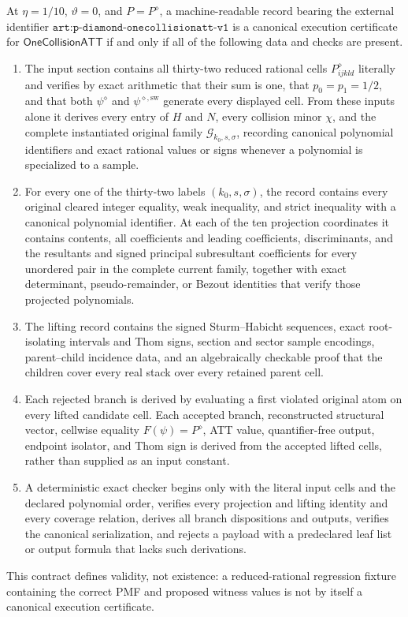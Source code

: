 At \(\eta=1/10\), \(\vartheta=0\), and \(P=P^\diamond\), a machine-readable
record bearing the external identifier
\(\texttt{art:p-diamond-onecollisionatt-v1}\) is a canonical execution
certificate for \(\mathsf{OneCollisionATT}\) if and only if all of the
following data and checks are present.
\begin{enumerate}
\item The input section contains all thirty-two reduced rational cells
\(P^\diamond_{ijkld}\) literally and verifies by exact arithmetic that their
sum is one, that \(p_0=p_1=1/2\), and that both \(\psi^\diamond\) and
\(\psi^{\diamond,\mathrm{sw}}\) generate every displayed cell. From these
inputs alone it derives every entry of \(H\) and \(N\), every collision minor
\(\chi\), and the complete instantiated original family
\(\mathscr G_{k_0,s,\sigma}\), recording canonical polynomial identifiers and
exact rational values or signs whenever a polynomial is specialized to a
sample.
\item For every one of the thirty-two labels \((k_0,s,\sigma)\), the record
contains every original cleared integer equality, weak inequality, and strict
inequality with a canonical polynomial identifier. At each of the ten
projection coordinates it contains contents, all coefficients and leading
coefficients, discriminants, and the resultants and signed principal
subresultant coefficients for every unordered pair in the complete current
family, together with exact determinant, pseudo-remainder, or Bezout
identities that verify those projected polynomials.
\item The lifting record contains the signed Sturm--Habicht sequences, exact
root-isolating intervals and Thom signs, section and sector sample encodings,
parent--child incidence data, and an algebraically checkable proof that the
children cover every real stack over every retained parent cell.
\item Each rejected branch is derived by evaluating a first violated original
atom on every lifted candidate cell. Each accepted branch, reconstructed
structural vector, cellwise equality \(F(\psi)=P^\diamond\), ATT value,
quantifier-free output, endpoint isolator, and Thom sign is derived from the
accepted lifted cells, rather than supplied as an input constant.
\item A deterministic exact checker begins only with the literal input cells
and the declared polynomial order, verifies every projection and lifting
identity and every coverage relation, derives all branch dispositions and
outputs, verifies the canonical serialization, and rejects a payload with a
predeclared leaf list or output formula that lacks such derivations.
\end{enumerate}
This contract defines validity, not existence: a reduced-rational regression
fixture containing the correct PMF and proposed witness values is not by
itself a canonical execution certificate.
